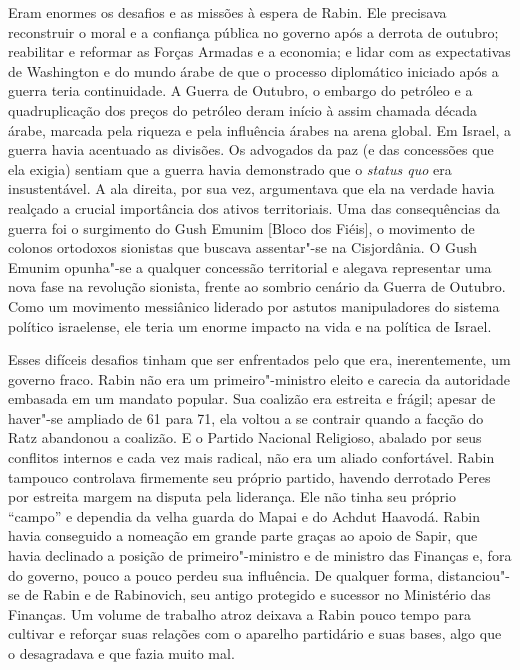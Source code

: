 Eram enormes os desafios e as missões à espera de Rabin. Ele precisava
reconstruir o moral e a confiança pública no governo após a derrota de
outubro; reabilitar e reformar as Forças Armadas e a economia; e lidar
com as expectativas de Washington e do mundo árabe de que o processo
diplomático iniciado após a guerra teria continuidade. A Guerra de
Outubro, o embargo do petróleo e a quadruplicação dos preços do petróleo
deram início à assim chamada década árabe, marcada pela riqueza e pela
influência árabes na arena global. Em Israel, a guerra havia acentuado
as divisões. Os advogados da paz (e das concessões que ela exigia)
sentiam que a guerra havia demonstrado que o \textit{status quo} era
insustentável. A ala direita, por sua vez, argumentava que ela na
verdade havia realçado a crucial importância dos ativos territoriais.
Uma das consequências da guerra foi o surgimento do Gush Emunim {[}Bloco
dos Fiéis{]}, o movimento de colonos ortodoxos sionistas que buscava
assentar"-se na Cisjordânia. O Gush Emunim opunha"-se a qualquer concessão
territorial e alegava representar uma nova fase na revolução sionista,
frente ao sombrio cenário da Guerra de Outubro. Como um movimento
messiânico liderado por astutos manipuladores do sistema político
israelense, ele teria um enorme impacto na vida e na política de Israel.

Esses difíceis desafios tinham que ser enfrentados pelo que era,
inerentemente, um governo fraco. Rabin não era um primeiro"-ministro
eleito e carecia da autoridade embasada em um mandato popular. Sua
coalizão era estreita e frágil; apesar de haver"-se ampliado de 61 para
71, ela voltou a se contrair quando a facção do Ratz abandonou a
coalizão. E o Partido Nacional Religioso, abalado por seus conflitos
internos e cada vez mais radical, não era um aliado confortável. Rabin
tampouco controlava firmemente seu próprio partido, havendo derrotado
Peres por estreita margem na disputa pela liderança. Ele não tinha seu
próprio ``campo'' e dependia da velha guarda do Mapai e do
Achdut Haavodá. Rabin havia conseguido a nomeação em grande parte graças
ao apoio de Sapir, que havia declinado a posição de primeiro"-ministro e
de ministro das Finanças e, fora do governo, pouco a pouco perdeu sua
influência. De qualquer forma, distanciou"-se de Rabin e de
Rabinovich, seu antigo protegido e sucessor no Ministério das Finanças.
Um volume de trabalho atroz deixava a Rabin pouco tempo para cultivar e
reforçar suas relações com o aparelho partidário e suas bases, algo que
o desagradava e que fazia muito mal.


